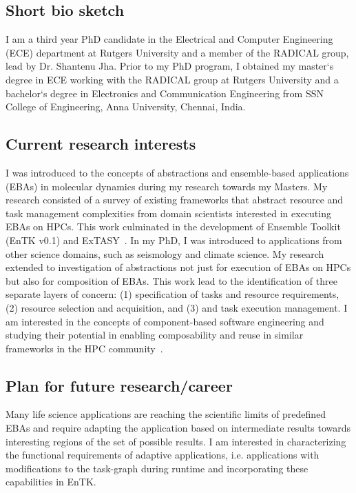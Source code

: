 \subsection{Short bio sketch}
I am a third year PhD candidate in the Electrical and Computer Engineering (ECE)
department at Rutgers University and a member of the RADICAL group, lead by 
Dr. Shantenu Jha. Prior to my PhD program, I obtained my master`s degree in ECE 
working with the RADICAL group at Rutgers University and a bachelor`s degree in 
Electronics and Communication Engineering from SSN College of Engineering, Anna 
University, Chennai, India.

\subsection{Current research interests}
I was introduced to the concepts of abstractions and ensemble-based applications
(EBAs) in molecular dynamics during my research towards my Masters. My research 
consisted of a survey of existing frameworks that abstract resource and task 
management complexities from domain scientists interested in executing EBAs on 
HPCs. This work culminated in the development of Ensemble Toolkit~\cite{entk} 
(EnTK v0.1) and ExTASY~\cite{extasy}. In my PhD, I was introduced to 
applications from other science domains, such as seismology and climate science.
My research extended to investigation of abstractions not just for execution of 
EBAs on HPCs but also for composition of EBAs. This work lead to the 
identification of three separate layers of concern: (1) specification of tasks 
and resource requirements, (2) resource selection and acquisition, and (3) and 
task execution management. I am interested in the concepts of component-based 
software engineering and studying their potential in enabling composability and 
reuse in similar frameworks in the HPC community~\cite{review_bb_2016}.

\subsection{Plan for future research/career}
Many life science applications are reaching the scientific limits of predefined
EBAs and require adapting the application based on intermediate results towards
interesting regions of the set of possible results. I am interested in 
characterizing the functional requirements of adaptive applications, i.e. 
applications with modifications to the task-graph during runtime and 
incorporating these capabilities in EnTK.

